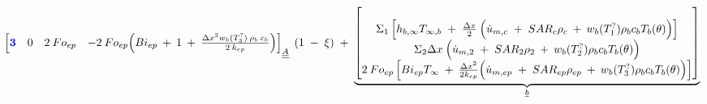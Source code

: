 \begin{landscape}
\begin{center}
{\begin{minipage}{10cm}
\begin{minipage}{1.4\columnwidth}
{\begin{gather*}
{\begin{array}{@{}c@{}}
\begin{bmatrix}
								\textcolor{blue}{\textbf{3}} & 0 & 2 \: Fo_{ep} & - 2 \: Fo_{ep} \Big(Bi_{ep} \:+\: 1 \:+\:  \frac{{\Delta x}^2 w_b (T_3^?) \: \rho _b \: c_b}{2 \: k_{ep}} \Big) \\
							\end{bmatrix}
						\end{array}									
							}_{\underline{\underline{A}}}
								\; \left( 1 \;-\; \xi \right)
							\;+\;	
							\underbrace{								
									\begin{bmatrix}
							\phantom{   }\\
							\Sigma_1 \left[h_{b, \infty} T_{\infty,b} \;+\; \frac{\Delta x}{2} \: \Big(\Dot{u}_{m,c} \;+\; SAR_{c} \rho_{c} \:+\:  w_b (T_1^?) \rho _b c_b T_b(\theta)\Big)\right] \\
							\Sigma_2 \Delta x \: \Big(\Dot{u}_{m,2} \;+\; SAR_{2} \rho_{2} \:+\:  w_b (T_2^?) \rho _b c_b T_b(\theta)\Big) \\
							2 \: Fo_{ep} \left[Bi_{ep} T_{\infty} \:+\: \frac{{\Delta x}^2}{2 k_{ep}} \Big(\Dot{u}_{m,ep} \;+\; SAR_{ep} \rho_{ep} \:+\:  w_b (T_3^?) \rho _b c_b T_b(\theta)\Big)\right]
						\end{bmatrix}									
							}_{\underline{b}}
					\end{gather*}}
					\end{minipage}
				
			\end{minipage}}
		\end{center}
\end{landscape}


\newpage

